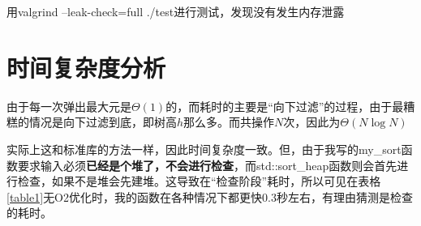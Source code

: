 \documentclass[UTF8]{ctexart}
\begin{document}
用valgrind --leak-check=full ./test进行测试，发现没有发生内存泄露 \

\section{时间复杂度分析}

由于每一次弹出最大元是$\Theta(1)$的，而耗时的主要是“向下过滤”的过程，由于最糟糕的情况是向下过滤到底，即树高$h$那么多。而共操作$N$次，因此为$\Theta(N \log N)$

实际上这和标准库的方法一样，因此时间复杂度一致。但，由于我写的my\_sort函数要求输入必须\textbf{已经是个堆了，不会进行检查}，而std::sort\_heap函数则会首先进行检查，如果不是堆会先建堆。这导致在“检查阶段”耗时，所以可见在表格\ref{table1}无O2优化时，我的函数在各种情况下都更快0.3秒左右，有理由猜测是检查的耗时。
\end{document}

